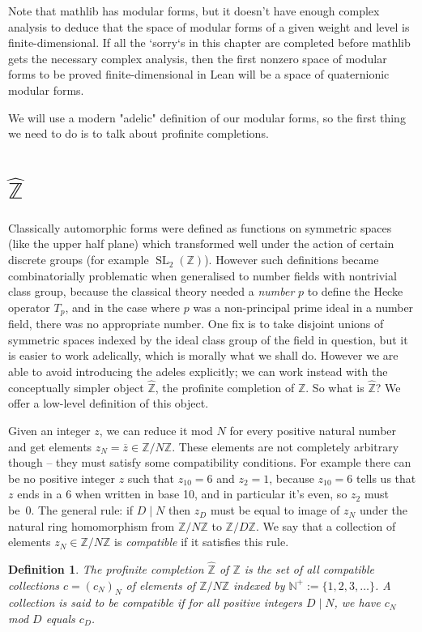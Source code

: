 \documentclass[10pt,a4paper]{article}
\newcommand{\Z}{\mathbb{Z}}
\newcommand{\N}{\mathbb{N}}
\newcommand{\Zhat}{\widehat{\Z}}
\DeclareMathOperator{\SL}{SL}
\newcounter{chapter}
\newtheorem{definition}[theorem]{Definition}
\newcommand{\lean}[1]{}
\newcommand{\leanok}{}
\begin{document}
Note that mathlib has modular forms, but it doesn't have enough complex analysis to deduce
that the space of modular forms of a given weight and level is finite-dimensional. If all
the `sorry`s in this chapter are completed
before mathlib gets the necessary complex analysis, then the first nonzero space of modular forms
to be proved finite-dimensional in Lean will be a space of quaternionic modular forms.

We will use a modern "adelic" definition of our modular forms, so the first thing we need
to do is to talk about profinite completions.

\section{\texorpdfstring{$\Zhat$}{Zhat}}

Classically automorphic forms were defined as functions on symmetric spaces (like the upper half
plane) which transformed well under the action of certain discrete groups (for example $\SL_2(\Z)$).
However such definitions became combinatorially problematic when generalised to number fields
with nontrivial class group, because the classical theory needed a \emph{number} $p$ to define
the Hecke operator $T_p$, and in the case where $p$ was a non-principal prime ideal in a number
field, there was no appropriate number. One fix is to take disjoint unions of symmetric spaces
indexed by the ideal class group of the field in question, but it is easier to work adelically,
which is morally what we shall do. However we are able to avoid introducing the adeles
explicitly; we can work instead with the conceptually simpler object $\Zhat$,
the profinite completion of $\Z$. So what is $\Zhat$? We offer a low-level definition of this object.

Given an integer $z$, we can reduce it mod $N$ for every positive natural
number and get elements $z_N=\overline{z}\in\Z/N\Z$. These elements are not completely arbitrary
though -- they must satisfy some compatibility conditions. For example there can be no
positive integer $z$ such that $z_{10}=6$ and $z_2=1$, because $z_{10}=6$ tells us that
$z$ ends in a 6 when written in base 10, and in particular it's even, so $z_2$ must be~0.
The general rule: if $D\mid N$ then $z_D$ must be equal to image of $z_N$ under the natural
ring homomorphism from $\Z/N\Z$ to $\Z/D\Z$. We say that a collection of elements
$z_N\in\Z/N\Z$ is \emph{compatible} if it satisfies this rule.

\begin{definition}\label{ZHat}\lean{ZHat}\leanok The profinite completion $\Zhat$ of $\Z$ is the set of
    all compatible collections $c=(c_N)_N$ of elements of $\Z/N\Z$ indexed by $\N^+:=\{1,2,3,\ldots\}$.
    A collection is said to be \emph{compatible} if for all positive integers
    $D\mid N$, we have $c_N$ mod $D$ equals $c_D$.
\end{definition}
\end{document}
